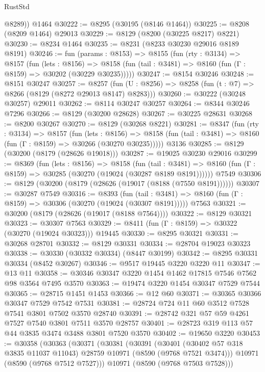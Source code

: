 \begin{lexlean}{RustStd}
\begin{coremodule}
        @8289))
    @1464
@30222 := @8295 (@30195 (@8146 @1464))
@30225 := @8208 (@8209 @1464) @29013
@30229 := @8129 (@8200 (@30225 @8217) @8221)
@30230 := @8234 @1464
@30235 := @8231 (@8233 @30230 @29016 @8189 @8191)
@30246 := fun (params : @8153) =>
  @8155
    (fun (rty : @3134) =>
    @8157
      (fun (lets : @8156) =>
      @8158 (fun (tail : @3481) => @8160 (fun (Γ : @8159) => @30202 (@30229 @30235)))))
@30247 := @8154 @30246
@30248 := @8151 @30247
@30257 := @8257
    (fun (U : @8256) => @8258 (fun (t : @7) => @8266 (@8129 (@8272 @29013 @8147) @8283)))
@30260 := @30222 (@30248 @30257) @29011
@30262 := @8114 @30247 @30257
@30264 := @8344 @30246 @7296
@30266 := @8129 (@30200 @28628)
@30267 := @30225 @28631
@30268 := @8200 @30267
@30270 := @8129 (@30268 @8221)
@30281 := @8347
    (fun (rty : @3134) =>
    @8157
      (fun (lets : @8156) =>
      @8158 (fun (tail : @3481) => @8160 (fun (Γ : @8159) => @30266 (@30270 @30235)))))
    @3136
@30285 := @8129 (@30200 (@8179 (@28626 @19018)))
@30287 := @19025 @30230 @29016
@30299 := @8369
    (fun (lets : @8156) =>
    @8158
      (fun (tail : @3481) =>
      @8160 (fun (Γ : @8159) => @30285 (@30270 (@19024 (@30287 @8189 @8191))))))
    @7549
@30306 := @8129 (@30200 (@8179 (@28626 (@19017 (@8188 (@7550 @8191))))))
@30307 := @30287 @7549
@30316 := @8393
    (fun (tail : @3481) => @8160 (fun (Γ : @8159) => @30306 (@30270 (@19024 (@30307 @8191)))))
    @7563
@30321 := @30200 (@8179 (@28626 (@19017 (@8188 @7564))))
@30322 := @8129 @30321
@30323 := @30307 @7563
@30329 := @8411 (fun (Γ : @8159) => @30322 (@30270 (@19024 @30323))) @19445
@30330 := @8295 @30321
@30331 := @30268 @28701
@30332 := @8129 @30331
@30334 := @28704 @19023 @30323
@30338 := @30330 (@30332 @30334) (@8447 @30199)
@30342 := @8295 @30331 @30334 (@8452 @30267)
@30346 := @9517 @19445 @3220 @3220 @11
@30347 := @13 @11
@30358 := @30346 @30347 @3220 @1454 @1462 @17815 @7546 @7562 @98 @3564 @7495 @3570
@30363 := @19474 @3220 @1454 @30347 @7529 @7544
@30365 := @28715 @1451 @1453
@30366 := @12 @60
@30371 := @30365 @30366 @30347 @7529 @7542 @7531
@30381 := @28724 @724 @11 @60 @3512 @7528 @7541 @3801 @7502 @3570 @28740
@30391 := @28742 @321 @57 @59 @4261 @7527 @7540 @3801 @7511 @3570 @28757
@30401 := @28723 @319 @113 @57 @44 @3835 @3474 @3488 @3801 @7520 @3570
@30402 := @19650 @3220
@30453 := @30358
    (@30363
      (@30371
        (@30381
          (@30391
            (@30401 (@30402 @57 @318 @3835 @11037 @11043) @28759 @10971 (@8590 (@9768 @7521 @3474)))
            @10971
            (@8590 (@9768 @7512 @7527)))
          @10971
          (@8590 (@9768 @7503 @7528)))

\end{coremodule}
\end{lexlean}
